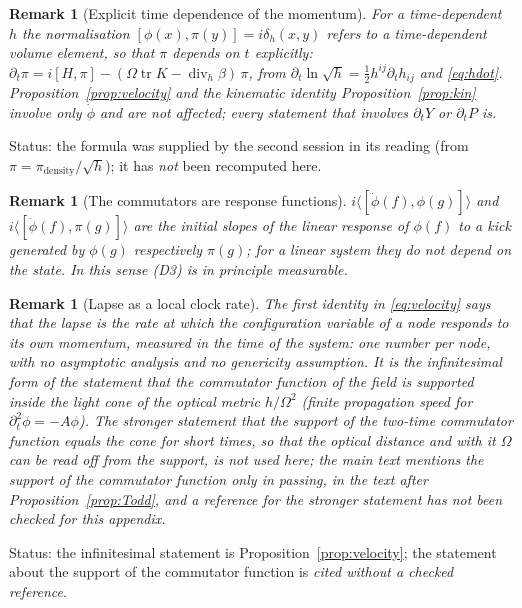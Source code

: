 \documentclass[11pt,a4paper]{article}
\theoremstyle{stmt}
\theoremstyle{defn}
\theoremstyle{rmk}
\newtheorem{remark}[theorem]{Remark}
\numberwithin{equation}{section}
\DeclareMathOperator{\tr}{tr}
\newcommand{\status}[1]{\par\noindent\textsf{\small Status: #1}\par}
\begin{document}
{\begin{remark}[Explicit time dependence of the momentum]
For a time-dependent $h$ the normalisation $[\phi(x),\pi(y)]=i\delta_h(x,y)$ refers to a time-dependent volume element, so that $\pi$ depends on $t$ explicitly: $\partial_t\pi=i[H,\pi]-(\Omega\tr K-\operatorname{div}_h\beta)\,\pi$, from $\partial_t\ln\sqrt h=\tfrac12h^{ij}\partial_th_{ij}$ and \eqref{eq:hdot}. Proposition~\ref{prop:velocity} and the kinematic identity Proposition~\ref{prop:kin} involve only $\dot\phi$ and are not affected; every statement that involves $\partial_tY$ or $\partial_tP$ is.
\end{remark}
\status{the formula was supplied by the second session in its reading (from $\pi=\pi_{\mathrm{density}}/\sqrt h$); it has \emph{not} been recomputed here.}

\begin{remark}[The commutators are response functions]
$i\langle[\dot\phi(f),\phi(g)]\rangle$ and $i\langle[\dot\phi(f),\pi(g)]\rangle$ are the initial slopes of the linear response of $\phi(f)$ to a kick generated by $\phi(g)$ respectively $\pi(g)$; for a linear system they do not depend on the state. In this sense \textup{(D3)} is in principle measurable.
\end{remark}

\begin{remark}[Lapse as a local clock rate]
The first identity in \eqref{eq:velocity} says that the lapse is the rate at which the configuration variable of a node responds to its own momentum, measured in the time of the system: one number per node, with no asymptotic analysis and no genericity assumption. It is the infinitesimal form of the statement that the commutator function of the field is supported inside the light cone of the optical metric $h/\Omega^2$ (finite propagation speed for $\partial_t^2\phi=-A\phi$). The stronger statement that the support of the two-time commutator function \emph{equals} the cone for short times, so that the optical distance and with it $\Omega$ can be read off from the support, is not used here; the main text mentions the support of the commutator function only in passing, in the text after Proposition~\ref{prop:Todd}, and a reference for the stronger statement has not been checked for this appendix.
\end{remark}
\status{the infinitesimal statement is Proposition~\ref{prop:velocity}; the statement about the support of the commutator function is \emph{cited without a checked reference}.}

}
\end{document}

